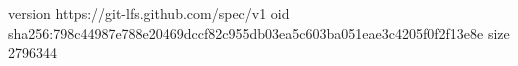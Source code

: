 version https://git-lfs.github.com/spec/v1
oid sha256:798c44987e788e20469dccf82c955db03ea5c603ba051eae3c4205f0f2f13e8e
size 2796344
